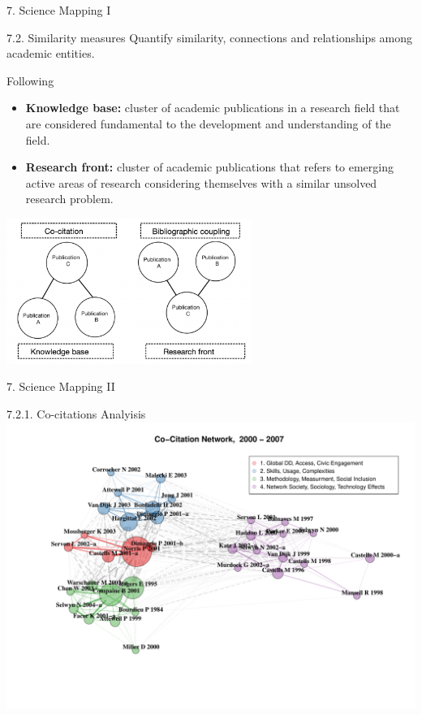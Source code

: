 \documentclass[
  ignorenonframetext,
]{beamer}
\begin{document}
\begin{frame}{7. Science Mapping I}
\protect\hypertarget{science-mapping-i}{}
\begin{block}{7.2. Similarity measures}
\protect\hypertarget{similarity-measures}{}
Quantify similarity, connections and relationships among academic
entities.

Following \citet{kammerer2021}

\begin{itemize}
\item
  \textbf{Knowledge base:} cluster of academic publications in a
  research field that are considered fundamental to the development and
  understanding of the field.
\item
  \textbf{Research front:} cluster of academic publications that refers
  to emerging active areas of research considering themselves with a
  similar unsolved research problem.
\end{itemize}

\begin{center}
\includegraphics[width=0.6\textwidth]{pic_1.png}
\end{center}
\end{block}
\end{frame}

\begin{frame}{7. Science Mapping II}
\protect\hypertarget{science-mapping-ii}{}
\vspace{0.5cm}

\begin{block}{7.2.1. Co-citations Analyisis}
\protect\hypertarget{co-citations-analyisis}{}
\includegraphics{Presentation_bibliometric_Madrid_june_20_files/figure-beamer/Co_cite_P1-1.pdf}
\end{block}
\end{frame}
\end{document}
